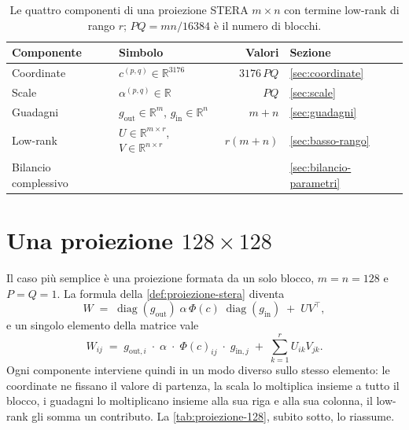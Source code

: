 \begin{table}[H]
\centering
\small
\begin{tabular}{llrl}
\toprule
Componente & Simbolo & Valori & Sezione \\
\midrule
Coordinate & $c^{(p,q)}\in\mathbb{R}^{3176}$ & $3176\,PQ$ & \ref{sec:coordinate} \\
Scale & $\alpha^{(p,q)}\in\mathbb{R}$ & $PQ$ & \ref{sec:scale} \\
Guadagni & $g_{\mathrm{out}}\in\mathbb{R}^{m}$, $g_{\mathrm{in}}\in\mathbb{R}^{n}$ & $m+n$ & \ref{sec:guadagni} \\
Low-rank & $U\in\mathbb{R}^{m\times r}$, $V\in\mathbb{R}^{n\times r}$ & $r(m+n)$ & \ref{sec:basso-rango} \\
\midrule
Bilancio complessivo & & & \ref{sec:bilancio-parametri} \\
\bottomrule
\end{tabular}
\caption{Le quattro componenti di una proiezione STERA $m\times n$ con termine low-rank di rango $r$; $PQ=mn/16384$ è il numero di blocchi.}
\label{tab:componenti-proiezione}
\end{table}

\section{Una proiezione $128\times128$}
\label{sec:esempio-128}

Il caso più semplice è una proiezione formata da un solo blocco, $m=n=128$ e $P=Q=1$. La formula della \autoref{def:proiezione-stera} diventa
\[
W \;=\; \operatorname{diag}(g_{\mathrm{out}})\;\alpha\,\Phi(c)\;\operatorname{diag}(g_{\mathrm{in}}) \;+\; UV^\top,
\]
e un singolo elemento della matrice vale
\begin{equation}
W_{ij} \;=\; g_{\mathrm{out},i}\;\cdot\;\alpha\;\cdot\;\Phi(c)_{ij}\;\cdot\;g_{\mathrm{in},j}\;+\;\sum_{k=1}^{r} U_{ik}V_{jk}.
\label{eq:elemento-proiezione}
\end{equation}
Ogni componente interviene quindi in un modo diverso sullo stesso elemento: le coordinate ne fissano il valore di partenza, la scala lo moltiplica insieme a tutto il blocco, i guadagni lo moltiplicano insieme alla sua riga e alla sua colonna, il low-rank gli somma un contributo. La \autoref{tab:proiezione-128}, subito sotto, lo riassume.

